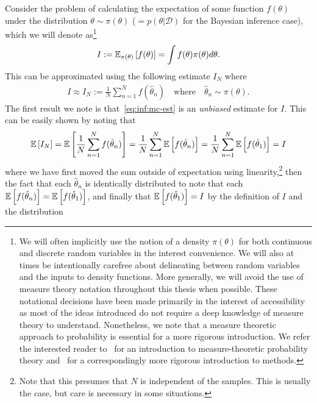 Consider the problem of calculating the expectation of some function
$f(\theta)$ under the distribution $\theta\sim \pi(\theta)$ ($= p(\theta | \mathcal{D})$ for the Bayesian
inference case), which we will denote 
as\footnote{We will often implicitly use the notion of a density
	$\pi(\theta)$ for both continuous and discrete random variables in the interest
	convenience.  We will also at times be intentionally carefree about delineating between random
	variables and the inputs to density functions.  More generally, we will avoid the use of measure
	theory notation throughout this thesis when possible.  These notational decisions have been made
	primarily in the interest of accessibility as most of the ideas introduced do not require a deep
	knowledge of measure theory to understand.  Nonetheless, we note that a measure theoretic
	approach to probability is essential for a more rigorous introduction.  We refer
	the interested reader to~\cite{durrett2010probability} for an introduction to measure-theoretic
	probability theory and~\cite{robert2004monte} for a correspondingly more rigorous introduction
	to \mc methods.}
\begin{align}
	\label{eq:inf:expt}
I:=\mathbb{E}_{\pi(\theta)} \left[f(\theta)\right]=\int f(\theta) \pi(\theta) d\theta.
\end{align}
This can be approximated using the following \mc estimate $I_N$ where
\begin{align}
	\label{eq:inf:mc-est}
	I \approx I_N := \frac{1}{N} \sum_{n=1}^{N}f(\hat{\theta}_n)
	\quad \text{where} \quad \hat{\theta}_n \sim \pi(\theta).
\end{align}
The first result we note is that~\eqref{eq:inf:mc-est} is an \emph{unbiased} estimate for $I$.  This can
be easily shown by noting that
\begin{align}
\label{eq:inf:unbiased}
\mathbb{E} \left[I_N\right] = \mathbb{E} \left[\frac{1}{N} \sum_{n=1}^{N}f(\hat{\theta}_n)\right]
= \frac{1}{N} \sum_{n=1}^{N} \mathbb{E} \left[f(\hat{\theta}_n)\right]
= \frac{1}{N} \sum_{n=1}^{N} \mathbb{E} \left[f(\hat{\theta}_1)\right]
= I
\end{align}
where we have first moved the sum outside of expectation using
linearity,\footnote{Note that this presumes that $N$ is independent
	of the samples.  This is usually the case, but care is necessary in some situations.}
then the fact that each $\hat{\theta}_n$ is identically distributed to note that
each $\mathbb{E} \left[f(\hat{\theta}_n)\right]= \mathbb{E} \left[f(\hat{\theta}_1)\right]$, and finally
that $\mathbb{E} \left[f(\hat{\theta}_1)\right] = I$ by the definition of $I$ and the distribution
